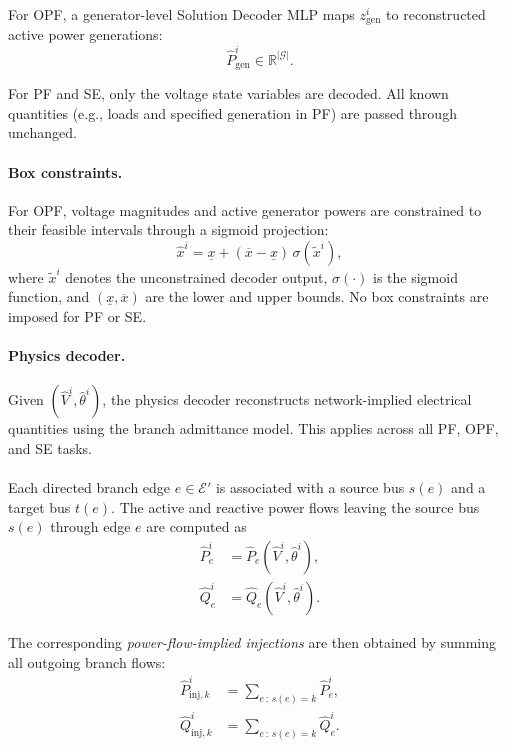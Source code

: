 For OPF, a generator-level Solution Decoder MLP maps
$z_{\mathrm{gen}}^i$
to reconstructed active power generations:
\begin{equation}
\hat{P}_{\mathrm{gen}}^i \in \mathbb{R}^{|\mathcal{G}|}.
\end{equation}

For PF and SE, only the voltage state variables are decoded.
All known quantities (e.g., loads and specified generation in PF) are passed through unchanged.

\paragraph{Box constraints.}

For OPF, voltage magnitudes and active generator powers are constrained to their feasible intervals through a sigmoid projection:
\begin{equation}
\hat{x}^i
=
\underline{x}
+
(\overline{x}-\underline{x})
\,\sigma(\tilde{x}^i),
\end{equation}
where $\tilde{x}^i$ denotes the unconstrained decoder output,
$\sigma(\cdot)$ is the sigmoid function,
and $(\underline{x},\overline{x})$ are the lower and upper bounds. No box constraints are imposed for PF or SE.

\paragraph{Physics decoder.}

Given $(\hat{V}^i,\hat{\theta}^i)$, the physics decoder reconstructs
network-implied electrical quantities using the branch admittance model. This applies across all PF, OPF, and SE tasks.
\\\\
Each directed branch edge
$e \in \mathcal{E}'$
is associated with a source bus
$s(e)$
and a target bus
$t(e)$.
The active and reactive power flows leaving the source bus $s(e)$ through edge $e$ are computed as
\begin{align}
\hat{P}_{e}^i
&=
\hat{P}_{e}(\hat{V}^i,\hat{\theta}^i),
\\
\hat{Q}_{e}^i
&=
\hat{Q}_{e}(\hat{V}^i,\hat{\theta}^i).
\end{align}

The corresponding \emph{power-flow-implied injections} are then obtained by summing all outgoing
branch flows:
\begin{align}
\label{eq:inj}
\hat{P}_{\mathrm{inj},k}^i
&=
\sum_{e\,:\,s(e)=k}
\hat{P}_{e}^i,
\\
\hat{Q}_{\mathrm{inj},k}^i
&=
\sum_{e\,:\,s(e)=k}
\hat{Q}_{e}^i.
\end{align}

